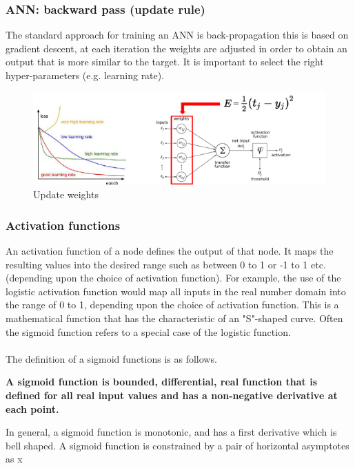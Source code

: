 \subsubsection{ANN: backward pass (update rule)}
The standard approach for training an ANN is back-propagation this is based on gradient descent, at each iteration the weights are adjusted in order to obtain an output that is more similar to the target. It is important to select the right hyper-parameters (e.g. learning rate).
\begin{figure}[!htbp]
    \centering
    \includegraphics[width= \textwidth]{Images/UpdateRule.PNG}
    \caption{Update weights}
    \label{fig`:dendrogram}
\end{figure}
\smallskip
\subsubsection{Activation functions}
An activation function of a node defines the output of that node. It maps the resulting values into the desired range such as between 0 to 1 or -1 to 1 etc. (depending upon the choice of activation function). For example, the use of the logistic activation function would map all inputs in the real number domain into the range of 0 to 1, depending upon the choice of activation function.
This is a mathematical function that has the characteristic of an "S"-shaped curve. Often the sigmoid function refers to a special case of the logistic function. \\\\
The definition of a sigmoid functions is as follows. 
\begin{center}
    \textbf{A sigmoid function is bounded, differential, real function that is defined for all real input values and has a non-negative derivative at each point.}
\end{center}
In general, a sigmoid function is monotonic, and has a first derivative which is bell shaped. A sigmoid function is constrained by a pair of horizontal asymptotes as {\displaystyle x\rightarrow \pm \infty }
